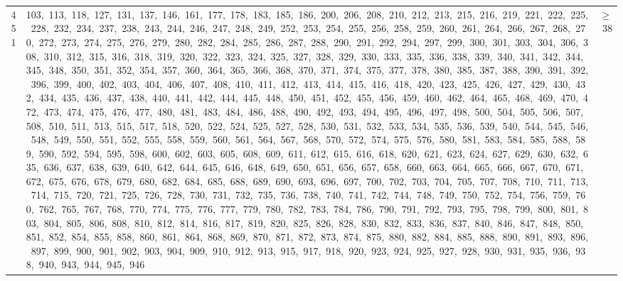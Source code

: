 \begin{longtable}{c|p{}|r}
451 & 103,\ 113,\ 118,\ 127,\ 131,\ 137,\ 146,\ 161,\ 177,\ 178,\ 183,\ 185,\ 186,\ 200,\ 206,\ 208,\ 210,\ 212,\ 213,\ 215,\ 216,\ 219,\ 221,\ 222,\ 225,\ 228,\ 232,\ 234,\ 237,\ 238,\ 243,\ 244,\ 246,\ 247,\ 248,\ 249,\ 252,\ 253,\ 254,\ 255,\ 256,\ 258,\ 259,\ 260,\ 261,\ 264,\ 266,\ 267,\ 268,\ 270,\ 272,\ 273,\ 274,\ 275,\ 276,\ 279,\ 280,\ 282,\ 284,\ 285,\ 286,\ 287,\ 288,\ 290,\ 291,\ 292,\ 294,\ 297,\ 299,\ 300,\ 301,\ 303,\ 304,\ 306,\ 308,\ 310,\ 312,\ 315,\ 316,\ 318,\ 319,\ 320,\ 322,\ 323,\ 324,\ 325,\ 327,\ 328,\ 329,\ 330,\ 333,\ 335,\ 336,\ 338,\ 339,\ 340,\ 341,\ 342,\ 344,\ 345,\ 348,\ 350,\ 351,\ 352,\ 354,\ 357,\ 360,\ 364,\ 365,\ 366,\ 368,\ 370,\ 371,\ 374,\ 375,\ 377,\ 378,\ 380,\ 385,\ 387,\ 388,\ 390,\ 391,\ 392,\ 396,\ 399,\ 400,\ 402,\ 403,\ 404,\ 406,\ 407,\ 408,\ 410,\ 411,\ 412,\ 413,\ 414,\ 415,\ 416,\ 418,\ 420,\ 423,\ 425,\ 426,\ 427,\ 429,\ 430,\ 432,\ 434,\ 435,\ 436,\ 437,\ 438,\ 440,\ 441,\ 442,\ 444,\ 445,\ 448,\ 450,\ 451,\ 452,\ 455,\ 456,\ 459,\ 460,\ 462,\ 464,\ 465,\ 468,\ 469,\ 470,\ 472,\ 473,\ 474,\ 475,\ 476,\ 477,\ 480,\ 481,\ 483,\ 484,\ 486,\ 488,\ 490,\ 492,\ 493,\ 494,\ 495,\ 496,\ 497,\ 498,\ 500,\ 504,\ 505,\ 506,\ 507,\ 508,\ 510,\ 511,\ 513,\ 515,\ 517,\ 518,\ 520,\ 522,\ 524,\ 525,\ 527,\ 528,\ 530,\ 531,\ 532,\ 533,\ 534,\ 535,\ 536,\ 539,\ 540,\ 544,\ 545,\ 546,\ 548,\ 549,\ 550,\ 551,\ 552,\ 555,\ 558,\ 559,\ 560,\ 561,\ 564,\ 567,\ 568,\ 570,\ 572,\ 574,\ 575,\ 576,\ 580,\ 581,\ 583,\ 584,\ 585,\ 588,\ 589,\ 590,\ 592,\ 594,\ 595,\ 598,\ 600,\ 602,\ 603,\ 605,\ 608,\ 609,\ 611,\ 612,\ 615,\ 616,\ 618,\ 620,\ 621,\ 623,\ 624,\ 627,\ 629,\ 630,\ 632,\ 635,\ 636,\ 637,\ 638,\ 639,\ 640,\ 642,\ 644,\ 645,\ 646,\ 648,\ 649,\ 650,\ 651,\ 656,\ 657,\ 658,\ 660,\ 663,\ 664,\ 665,\ 666,\ 667,\ 670,\ 671,\ 672,\ 675,\ 676,\ 678,\ 679,\ 680,\ 682,\ 684,\ 685,\ 688,\ 689,\ 690,\ 693,\ 696,\ 697,\ 700,\ 702,\ 703,\ 704,\ 705,\ 707,\ 708,\ 710,\ 711,\ 713,\ 714,\ 715,\ 720,\ 721,\ 725,\ 726,\ 728,\ 730,\ 731,\ 732,\ 735,\ 736,\ 738,\ 740,\ 741,\ 742,\ 744,\ 748,\ 749,\ 750,\ 752,\ 754,\ 756,\ 759,\ 760,\ 762,\ 765,\ 767,\ 768,\ 770,\ 774,\ 775,\ 776,\ 777,\ 779,\ 780,\ 782,\ 783,\ 784,\ 786,\ 790,\ 791,\ 792,\ 793,\ 795,\ 798,\ 799,\ 800,\ 801,\ 803,\ 804,\ 805,\ 806,\ 808,\ 810,\ 812,\ 814,\ 816,\ 817,\ 819,\ 820,\ 825,\ 826,\ 828,\ 830,\ 832,\ 833,\ 836,\ 837,\ 840,\ 846,\ 847,\ 848,\ 850,\ 851,\ 852,\ 854,\ 855,\ 858,\ 860,\ 861,\ 864,\ 868,\ 869,\ 870,\ 871,\ 872,\ 873,\ 874,\ 875,\ 880,\ 882,\ 884,\ 885,\ 888,\ 890,\ 891,\ 893,\ 896,\ 897,\ 899,\ 900,\ 901,\ 902,\ 903,\ 904,\ 909,\ 910,\ 912,\ 913,\ 915,\ 917,\ 918,\ 920,\ 923,\ 924,\ 925,\ 927,\ 928,\ 930,\ 931,\ 935,\ 936,\ 938,\ 940,\ 943,\ 944,\ 945,\ 946 & $\ge$ 38 \\

\end{longtable}
